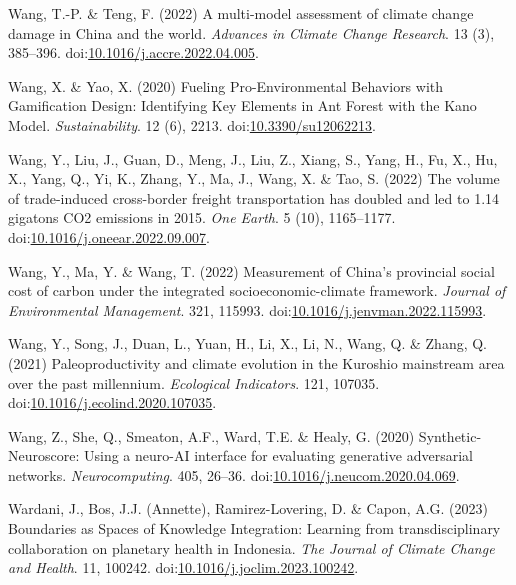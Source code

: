 \documentclass[
  letterpaper,
  DIV=11,
  numbers=noendperiod]{scrartcl}
\newlength{\cslhangindent}
\newenvironment{CSLReferences}[2] %
 {\begin{list}{}{%
  \setlength{\itemindent}{0pt}
  \setlength{\leftmargin}{0pt}
  \setlength{\parsep}{0pt}
  \ifodd #1
   \setlength{\leftmargin}{\cslhangindent}
   \setlength{\itemindent}{-1\cslhangindent}
  \fi
  \setlength{\itemsep}{#2\baselineskip}}}
 {\end{list}}
\begin{document}
\begin{CSLReferences}{0}{1}
Wang, T.-P. \& Teng, F. (2022) A multi-model assessment of climate
change damage in {China} and the world. \emph{Advances in Climate Change
Research}. 13 (3), 385--396.
doi:\href{https://doi.org/10.1016/j.accre.2022.04.005}{10.1016/j.accre.2022.04.005}.

Wang, X. \& Yao, X. (2020) Fueling {Pro-Environmental Behaviors} with
{Gamification Design}: {Identifying Key Elements} in {Ant Forest} with
the {Kano Model}. \emph{Sustainability}. 12 (6), 2213.
doi:\href{https://doi.org/10.3390/su12062213}{10.3390/su12062213}.

Wang, Y., Liu, J., Guan, D., Meng, J., Liu, Z., Xiang, S., Yang, H., Fu,
X., Hu, X., Yang, Q., Yi, K., Zhang, Y., Ma, J., Wang, X. \& Tao, S.
(2022) The volume of trade-induced cross-border freight transportation
has doubled and led to 1.14 gigatons {CO2} emissions in 2015. \emph{One
Earth}. 5 (10), 1165--1177.
doi:\href{https://doi.org/10.1016/j.oneear.2022.09.007}{10.1016/j.oneear.2022.09.007}.

Wang, Y., Ma, Y. \& Wang, T. (2022) Measurement of {China}'s provincial
social cost of carbon under the integrated socioeconomic-climate
framework. \emph{Journal of Environmental Management}. 321, 115993.
doi:\href{https://doi.org/10.1016/j.jenvman.2022.115993}{10.1016/j.jenvman.2022.115993}.

Wang, Y., Song, J., Duan, L., Yuan, H., Li, X., Li, N., Wang, Q. \&
Zhang, Q. (2021) Paleoproductivity and climate evolution in the
{Kuroshio} mainstream area over the past millennium. \emph{Ecological
Indicators}. 121, 107035.
doi:\href{https://doi.org/10.1016/j.ecolind.2020.107035}{10.1016/j.ecolind.2020.107035}.

Wang, Z., She, Q., Smeaton, A.F., Ward, T.E. \& Healy, G. (2020)
Synthetic-{Neuroscore}: {Using} a neuro-{AI} interface for evaluating
generative adversarial networks. \emph{Neurocomputing}. 405, 26--36.
doi:\href{https://doi.org/10.1016/j.neucom.2020.04.069}{10.1016/j.neucom.2020.04.069}.

Wardani, J., Bos, J.J. (Annette), Ramirez-Lovering, D. \& Capon, A.G.
(2023) Boundaries as {Spaces} of {Knowledge Integration}: {Learning}
from transdisciplinary collaboration on planetary health in {Indonesia}.
\emph{The Journal of Climate Change and Health}. 11, 100242.
doi:\href{https://doi.org/10.1016/j.joclim.2023.100242}{10.1016/j.joclim.2023.100242}.


\end{CSLReferences}
\end{document}
